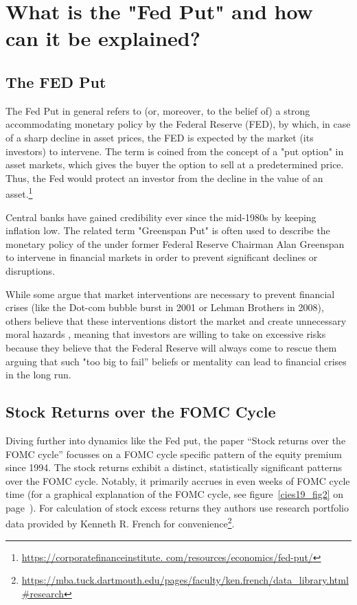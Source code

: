 \chapter{What is the "Fed Put" and how can it be explained?}
\section{The FED Put}
The Fed Put in general refers to (or, moreover, to the belief of) a strong accommodating monetary policy by the Federal Reserve (FED), by which, in case of a sharp decline in asset prices, the FED is expected by the market (its investors) to intervene. The term is coined from the concept of a "put option" in asset markets, which gives the buyer the option to sell at a predetermined price. Thus, the Fed would protect an investor from the decline in the value of an asset.\footnote{\url{https://corporatefinanceinstitute. com/resources/economics/fed-put/}}

Central banks have gained credibility ever since the mid-1980s by keeping inflation low. \parencite{hall_is_2011} The related term "Greenspan Put" is often used to describe the monetary policy of the under former Federal Reserve Chairman Alan Greenspan to intervene in financial markets in order to prevent significant declines or disruptions. 

While some argue that market interventions are necessary to prevent financial crises (like the Dot-com bubble burst in 2001 or Lehman Brothers in 2008), others believe that these interventions distort the market and create unnecessary moral hazards \parencite{cieslak_economics_2021},  meaning that investors are willing to take on excessive risks because they believe that the Federal Reserve will always come to rescue them arguing that such "too big to fail” beliefs or mentality can lead to financial crises in the long run.

\section{Stock Returns over the FOMC Cycle}

Diving further into dynamics like the Fed put,  the paper “Stock returns over the FOMC cycle” focusses on a FOMC cycle specific pattern of the equity premium since 1994. 
The stock returns exhibit a distinct,  statistically significant patterns over the FOMC cycle.  Notably,  it primarily accrues in even weeks of FOMC cycle time (for a graphical explanation of the FOMC cycle, see figure~\ref{cies19_fig2} on page~\pageref{cies19_fig2}). For calculation of stock excess returns they authors use research portfolio data provided by Kenneth R. French for convenience\footnote{\url{https://mba.tuck.dartmouth.edu/pages/faculty/ken.french/data_library.html\#research}}.


